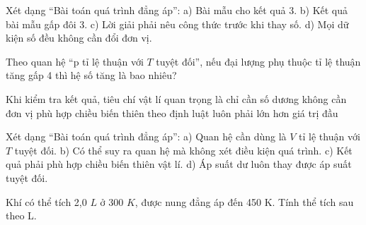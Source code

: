 \begin{ex}
Xét dạng “Bài toán quá trình đẳng áp”: a) Bài mẫu cho kết quả 3. b) Kết quả bài mẫu gấp đôi 3. c) Lời giải phải nêu công thức trước khi thay số. d) Mọi dữ kiện số đều không cần đổi đơn vị.
\choiceTF

\end{ex}

\begin{ex}
Theo quan hệ “p tỉ lệ thuận với $T$ tuyệt đối”, nếu đại lượng phụ thuộc tỉ lệ thuận tăng gấp 4 thì hệ số tăng là bao nhiêu?
\end{ex}

\begin{ex}
Khi kiểm tra kết quả, tiêu chí vật lí quan trọng là
\choice
{chỉ cần số dương}
{không cần đơn vị}
{\True phù hợp chiều biến thiên theo định luật}
{luôn phải lớn hơn giá trị đầu}
\end{ex}

\begin{ex}
Xét dạng “Bài toán quá trình đẳng áp”: a) Quan hệ cần dùng là $V$ tỉ lệ thuận với $T$ tuyệt đối. b) Có thể suy ra quan hệ mà không xét điều kiện quá trình. c) Kết quả phải phù hợp chiều biến thiên vật lí. d) Áp suất dư luôn thay được áp suất tuyệt đối.
\choiceTF

\end{ex}

\begin{ex}
Khí có thể tích 2,0 $L$ ở 300 $K$, được nung đẳng áp đến 450 K. Tính thể tích sau theo L.
\end{ex}

